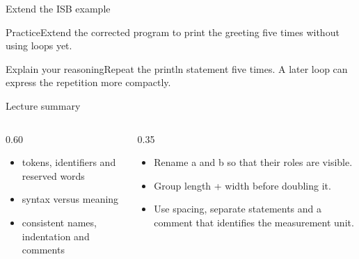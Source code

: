 \documentclass[10pt,aspectratio=169]{beamer}
\begin{document}
\begin{frame}[fragile,t]{Extend the ISB example}
\begin{alertblock}{Practice}Extend the corrected program to print the greeting five times without using loops yet.\end{alertblock}\vspace{3mm}\begin{exampleblock}{Explain your reasoning}Repeat the println statement five times. A later loop can express the repetition more compactly.\end{exampleblock}
\end{frame}
\begin{frame}[fragile,t]{Lecture summary}
\begin{columns}[T,onlytextwidth]\begin{column}{0.60\textwidth}
\begin{itemize}
\item tokens, identifiers and reserved words
\item syntax versus meaning
\item consistent names, indentation and comments
\end{itemize}
\end{column}\begin{column}{0.35\textwidth}\small
\begin{itemize}
\item Rename a and b so that their roles are visible.
\item Group length + width before doubling it.
\item Use spacing, separate statements and a comment that identifies the measurement unit.
\end{itemize}
\end{column}\end{columns}
\end{frame}
\end{document}

